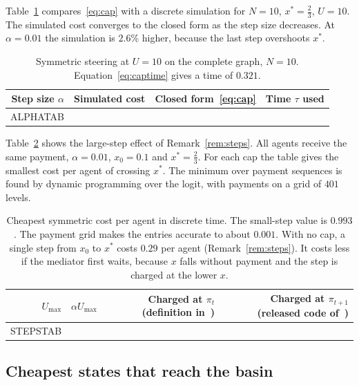 \documentclass[11pt,a4paper]{article}
\theoremstyle{definition}
\theoremstyle{plain}
\newcommand{\xs}{x^{*}}
\begin{document}
Table~\ref{tab:cap} compares~\eqref{eq:cap} with a discrete simulation for $N=10$, $\xs=\tfrac23$, $U=10$. The simulated cost converges to the closed form as the step size decreases. At $\alpha=0.01$ the simulation is $2.6\%$ higher, because the last step overshoots $\xs$.

\begin{table}[H]
\centering\small
\begin{tabular}{rrrr}
\toprule
Step size $\alpha$ & Simulated cost & Closed form~\eqref{eq:cap} & Time $\tau$ used\\
\midrule
ALPHATAB
\bottomrule
\end{tabular}
\caption{Symmetric steering at $U=10$ on the complete graph, $N=10$. Equation~\eqref{eq:captime} gives a time of $0.321$.}\label{tab:cap}
\end{table}

Table~\ref{tab:steps} shows the large-step effect of Remark~\ref{rem:steps}. All agents receive the same payment, $\alpha=0.01$, $x_0=0.1$ and $\xs=\tfrac23$. For each cap the table gives the smallest cost per agent of crossing $\xs$. The minimum over payment sequences is found by dynamic programming over the logit, with payments on a grid of $401$ levels.

\begin{table}[H]
\centering\small
\begin{tabular}{rrrr}
\toprule
$U_{\max}$ & $\alpha U_{\max}$ & Charged at $\pi_t$ (definition in~\cite{huang2025}) & Charged at $\pi_{t+1}$ (released code of~\cite{huang2025})\\
\midrule
STEPSTAB
\bottomrule
\end{tabular}
\caption{Cheapest symmetric cost per agent in discrete time. The small-step value is $0.993$. The payment grid makes the entries accurate to about $0.001$. With no cap, a single step from $x_0$ to $\xs$ costs $0.29$ per agent (Remark~\ref{rem:steps}). It costs less if the mediator first waits, because $x$ falls without payment and the step is charged at the lower $x$.}\label{tab:steps}
\end{table}

\subsection{Cheapest states that reach the basin}\label{sec:search}
\end{document}
